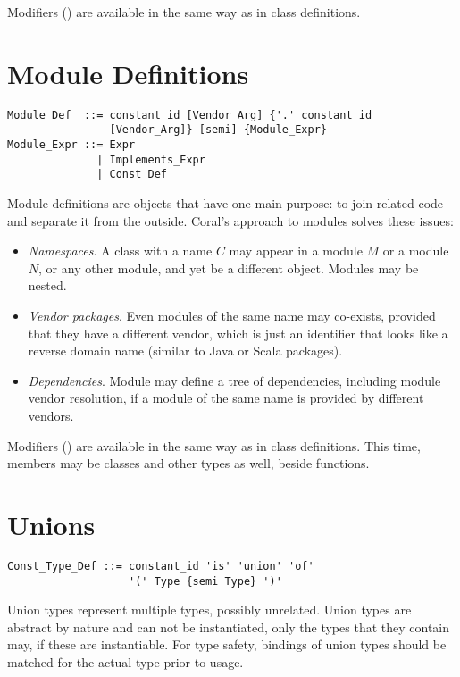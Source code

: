 Modifiers () are available in the same way as in class definitions. 

\section{Module Definitions}
\label{sec:module-definitions}

\syntax\begin{lstlisting}
Module_Def  ::= constant_id [Vendor_Arg] {'.' constant_id 
                [Vendor_Arg]} [semi] {Module_Expr}
Module_Expr ::= Expr
              | Implements_Expr
              | Const_Def
\end{lstlisting}

Module definitions are objects that have one main purpose: to join related code and separate it from the outside. Coral's approach to modules solves these issues: 
\begin{itemize}
\item {\em Namespaces}. A class with a name $C$ may appear in a module $M$ or a module $N$, or any other module, and yet be a different object. Modules may be nested.
\item {\em Vendor packages}. Even modules of the same name may co-exists, provided that they have a different vendor, which is just an identifier that looks like a reverse domain name (similar to Java or Scala packages). 
\item {\em Dependencies}. Module may define a tree of dependencies, including module vendor resolution, if a module of the same name is provided by different vendors. 
\end{itemize}

Modifiers () are available in the same way as in class definitions. This time, members may be classes and other types as well, beside functions. 
\section{Unions}
\label{sec:unions}

\syntax\begin{lstlisting}
Const_Type_Def ::= constant_id 'is' 'union' 'of'
                   '(' Type {semi Type} ')'
\end{lstlisting}

Union types represent multiple types, possibly unrelated. Union types are abstract by nature and can not be instantiated, only the types that they contain may, if these are instantiable. For type safety, bindings of union types should be matched for the actual type prior to usage. 

